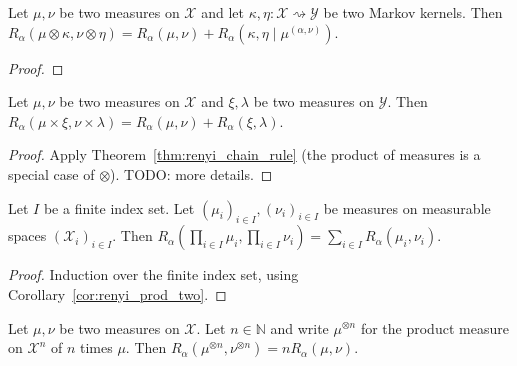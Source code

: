 \begin{theorem}
  \label{thm:renyi_chain_rule}
  Let $\mu, \nu$ be two measures on $\mathcal X$ and let $\kappa, \eta : \mathcal X \rightsquigarrow \mathcal Y$ be two Markov kernels.
  Then $R_\alpha(\mu \otimes \kappa, \nu \otimes \eta) = R_\alpha(\mu, \nu) + R_\alpha(\kappa, \eta \mid \mu^{(\alpha, \nu)})$.
\end{theorem}

\begin{proof}%
{}
\end{proof}

\begin{corollary}
  \label{cor:renyi_prod_two}
  Let $\mu, \nu$ be two measures on $\mathcal X$ and $\xi, \lambda$ be two measures on $\mathcal Y$.
  Then $R_\alpha(\mu \times \xi, \nu \times \lambda) = R_\alpha(\mu, \nu) + R_\alpha(\xi, \lambda)$.
\end{corollary}

\begin{proof}%
{}
Apply Theorem~\ref{thm:renyi_chain_rule} (the product of measures is a special case of $\otimes$). TODO: more details.
\end{proof}

\begin{theorem}
  \label{thm:renyi_prod}
  Let $I$ be a finite index set. Let $(\mu_i)_{i \in I}, (\nu_i)_{i \in I}$ be measures on measurable spaces $(\mathcal X_i)_{i \in I}$.
  Then $R_\alpha (\prod_{i \in I} \mu_i, \prod_{i \in I} \nu_i) = \sum_{i \in I} R_\alpha(\mu_i, \nu_i)$.
\end{theorem}

\begin{proof}%
{}
Induction over the finite index set, using Corollary~\ref{cor:renyi_prod_two}.
\end{proof}

\begin{corollary}
  \label{lem:renyi_prod_n}
  Let $\mu, \nu$ be two measures on $\mathcal X$. Let $n \in \mathbb{N}$ and write $\mu^{\otimes n}$ for the product measure on $\mathcal X^n$ of $n$ times $\mu$.
  Then $R_\alpha(\mu^{\otimes n}, \nu^{\otimes n}) = n R_\alpha(\mu, \nu)$.
\end{corollary}

